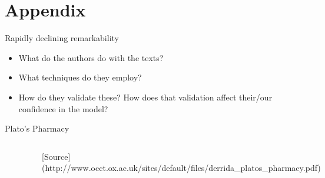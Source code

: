 \documentclass[
  10pt,
  ignorenonframetext,
  aspectratio=169]{beamer}
\newif\ifbibliography
\begin{document}
\hypertarget{appendix}{%
\section*{Appendix}\label{appendix}}

\begin{frame}{Rapidly declining remarkability}
\protect\hypertarget{rapidly-declining-remarkability}{}
\begin{itemize}
\item
  What do the authors do with the texts?
\item
  What techniques do they employ?
\item
  How do they validate these? How does that validation affect their/our
  confidence in the model?
\end{itemize}

\citep{moore_rapidly_2019}
\end{frame}

\begin{frame}{Plato's Pharmacy}
\protect\hypertarget{platos-pharmacy}{}
\label{PHARMAKON}

\hyperlink{CONSIDERATIONS}{}

\medskip

\centering
\begin{columns}
\centering
\begin{column}{0.5\linewidth}
\centering
\texttt{[image: logos.png]}
\end{column}

\begin{column}{0.5\linewidth}
\centering
\texttt{[image: thamus.png]}
\end{column}

\begin{column}{0.5\linewidth}

\end{column}

\medskip

[Source](http://www.occt.ox.ac.uk/sites/default/files/derrida\_platos\_pharmacy.pdf)

\end{columns}
\end{frame}

\begin{frame}[allowframebreaks]{}
  \bibliographytrue
  
\end{frame}
\end{document}
